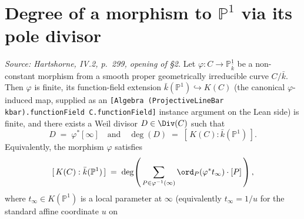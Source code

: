 \section{Degree of a morphism to \(\mathbb P^1\) via its pole divisor}
\begin{lemma}


  \label{lem:degree_via_pole_divisor}
  \textit{Source: Hartshorne, IV.2, p.~299, opening of \S2.}
  Let \(\varphi \colon C \to \mathbb P^1_{\bar k}\) be a non-constant morphism
  from a smooth proper geometrically irreducible curve \(C / \bar k\). Then
  \(\varphi\) is finite, its function-field extension
  \(\bar k(\mathbb P^1) \hookrightarrow K(C)\) (the canonical
  \(\varphi\)-induced map, supplied as an
  \texttt{[Algebra (ProjectiveLineBar kbar).functionField C.functionField]}
  instance argument on the Lean side) is finite, and there exists a Weil
  divisor \(D \in \Div(C)\) such that
  \[
    D \;=\; \varphi^*[\infty]
    \quad\text{and}\quad
    \deg(D) \;=\; [\,K(C) : \bar k(\mathbb P^1)\,].
  \]
  Equivalently, the morphism \(\varphi\) satisfies
  \[
    [\,K(C) : \bar k(\mathbb P^1)\,] \;=\;
    \deg\!\left(\,\sum_{P \in \varphi^{-1}(\infty)}
                  \ord_P(\varphi^* t_\infty) \cdot [P]\,\right),
  \]
  where \(t_\infty \in K(\mathbb P^1)\) is a local parameter at \(\infty\)
  (equivalently \(t_\infty = 1/u\) for the standard affine coordinate \(u\) on

\end{lemma}
